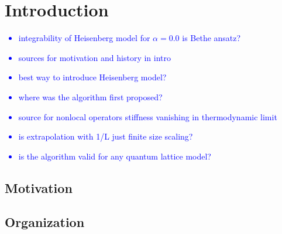 \chapter{Introduction}
\thispagestyle{chapterBeginStyle}

\textcolor{blue}{
    \begin{itemize}
        \item integrability of Heisenberg model for \(\alpha = 0.0 \) is Bethe ansatz?
        \item sources for motivation and history in intro
        \item best way to introduce Heisenberg model?
        \item where was the algorithm first proposed?
        \item source for nonlocal operators stiffness vanishing in thermodynamic limit
        \item is extrapolation with 1/L just finite size scaling?
        \item is the algorithm valid for any quantum lattice model?
    \end{itemize}
}


\section{Motivation}

\section{Organization}
